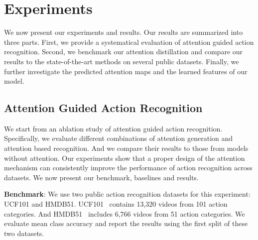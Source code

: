 \documentclass[10pt,twocolumn,letterpaper]{article}
\begin{document}
\section{Experiments}
We now present our experiments and results. Our results are summarized into three parts. First, we provide a systematical evaluation of attention guided action recognition. Second, we benchmark our attention distillation and compare our results to the state-of-the-art methods on several public datasets. Finally, we further investigate the predicted attention maps and the learned features of our model.

\subsection{Attention Guided Action Recognition}
We start from an ablation study of attention guided action recognition. Specifically, we evaluate different combinations of attention generation and attention based recognition. And we compare their results to those from models without attention. Our experiments show that a proper design of the attention mechanism can consistently improve the performance of action recognition across datasets. We now present our benchmark, baselines and results. 

\noindent \textbf{Benchmark}: We use two public action recognition datasets for this experiment: UCF101 and HMDB51. UCF101~\cite{Soomro2012UCF101AD} contains 13,320 videos from 101 action categories. And HMDB51~\cite{kuehne2011hmdb} includes 6,766 videos from 51 action categories. We evaluate mean class accuracy and report the results using the first split of these two datasets. 
\end{document}
